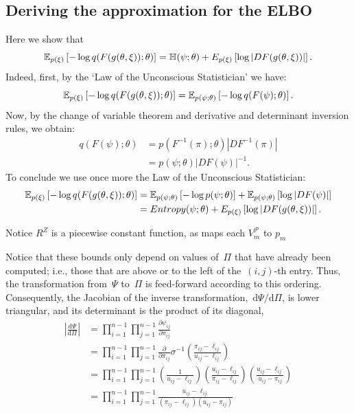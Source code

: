 \documentclass[twoside]{article}
\begin{document}


\subsection*{Deriving  the approximation for the ELBO}
Here we show that $$\mathbb{E}_{p(\xi)} \left[- \log q(F(g(\theta, \xi)); \theta) \right] = \mathbb{H}(\psi; \theta) +E_{p(\xi)}\left[\log | DF(g(\theta, \xi))|\right].$$
Indeed, first, by the `Law of the Unconscious Statistician' we have:
 $$\mathbb{E}_{p(\xi)} \left[- \log q(F(g(\theta, \xi)); \theta) \right] = \mathbb{E}_{p(\psi;\theta)} \left[- \log q(F(\psi); \theta) \right]. $$
Now, by the change of variable theorem and derivative and determinant inversion rules, we obtain:\begin{align}
q(F(\psi); \theta) & = p(F^{-1}(\pi) ;\theta)  |DF ^{-1}(\pi) | \\
 & = p(\psi;\theta) | DF (\psi) | ^{-1}.
 \end{align}
 To conclude we use once more the Law of the Unconscious Statistician:
 \begin{align}
 \mathbb{E}_{p(\xi)} \left[- \log q(F(g(\theta, \xi)); \theta) \right]  &= \mathbb{E}_{p(\psi;\theta)}\left[ - \log p(\psi;\theta)\right] +   \mathbb{E}_{p(\psi;\theta)}\left[\log | DF(\psi)|\right] \\
 &= Entropy(\psi; \theta)+E_{p(\xi)}\left[\log | DF(g(\theta, \xi))|\right].\end{align}
 
 Notice $R^Z$ is a piecewise constant function, as maps each $V^\mathcal{P}_{m}$ to $p_m$

Notice that these bounds only depend on values of~${\Pi}$ that
have already been computed; i.e., those that are above or to the left of
the~$(i,j)$-th entry. Thus, the transformation from~$\Psi$ to~${\Pi}$
is feed-forward according to this ordering.  Consequently, the
Jacobian of the inverse transformation,~$\mathrm{d}\Psi / \mathrm{d} \Pi$,
is lower triangular, and its determinant is the product of its diagonal,
\begin{align}
\left| \frac{\mathrm{d} \Psi } {\mathrm{d} \Pi} \right|
&= \prod_{i=1}^{n-1} \prod_{j=1}^{n-1} \frac{\partial \psi_{ij} }{\partial {\pi}_{ij}} \\
&= \prod_{i=1}^{n-1} \prod_{j=1}^{n-1} \frac{\partial}{\partial {\pi}_{ij}}
\sigma^{-1} \left( \frac{{\pi}_{ij} - \ell_{ij}}{u_{ij} - \ell_{ij}} \right ) \\
&= \prod_{i=1}^{n-1} \prod_{j=1}^{n-1}
\left( \frac{1}{u_{ij} - \ell_{ij}} \right )
\left( \frac{u_{ij} - \ell_{ij}}{{\pi}_{ij} - \ell_{ij}} \right )
\left( \frac{u_{ij} - \ell_{ij}}{u_{ij} - {\pi}_{ij}} \right ) \\
&= \prod_{i=1}^{n-1} \prod_{j=1}^{n-1}
\frac{u_{ij} - \ell_{ij}}{({\pi}_{ij} - \ell_{ij}) (u_{ij} - {\pi}_{ij})}
\end{align}
\end{document}
